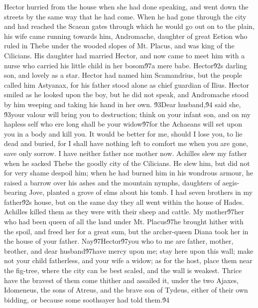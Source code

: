 {Hector hurried from the house when she had done speaking, and went down the streets by the same way that he had come. When he had gone through the city and had reached the Scaean gates through which he would go out on to the plain, his wife came running towards him, Andromache, daughter of great Eetion who ruled in Thebe under the wooded slopes of Mt. Placus, and was king of the Cilicians. His daughter had married Hector, and now came to meet him with a nurse who carried his little child in her bosom\'97a mere babe. Hector\'92s darling son, and lovely as a star. Hector had named him Scamandrius, but the people called him Astyanax, for his father stood alone as chief guardian of Ilius. Hector smiled as he looked upon the boy, but he did not speak, and Andromache stood by him weeping and taking his hand in her own. \'93Dear husband,\'94 said she, \'93your valour will bring you to destruction; think on your infant son, and on my hapless self who ere long shall be your widow\'97for the Achaeans will set upon you in a body and kill you. It would be better for me, should I lose you, to lie dead and buried, for I shall have nothing left to comfort me when you are gone, save only sorrow. I have neither father nor mother now. Achilles slew my father when he sacked Thebe the goodly city of the Cilicians. He slew him, but did not for very shame despoil him; when he had burned him in his wondrous armour, he raised a barrow over his ashes and the mountain nymphs, daughters of aegis-bearing Jove, planted a grove of elms about his tomb. I had seven brothers in my father\'92s house, but on the same day they all went within the house of Hades. Achilles killed them as they were with their sheep and cattle. My mother\'97her who had been queen of all the land under Mt. Placus\'97he brought hither with the spoil, and freed her for a great sum, but the archer-queen Diana took her in the house of your father. Nay\'97Hector\'97you who to me are father, mother, brother, and dear husband\'97have mercy upon me; stay here upon this wall; make not your child fatherless, and your wife a widow; as for the host, place them near the fig-tree, where the city can be best scaled, and the wall is weakest. Thrice have the bravest of them come thither and assailed it, under the two Ajaxes, Idomeneus, the sons of Atreus, and the brave son of Tydeus, either of their own bidding, or because some soothsayer had told them.\'94\
}
